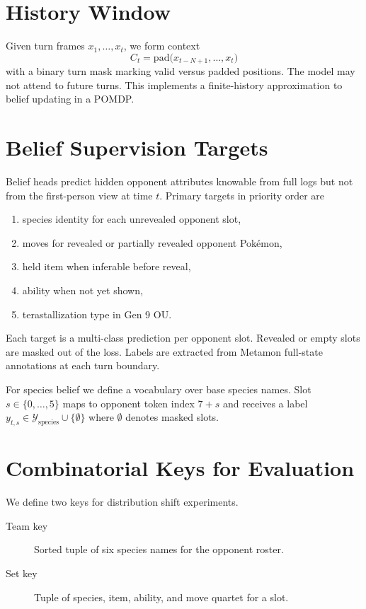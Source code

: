 \section{History Window}

Given turn frames $x_1, \ldots, x_t$, we form context
\[
  C_t = \mathrm{pad}\bigl(x_{t-N+1}, \ldots, x_t\bigr)
\]
with a binary turn mask marking valid versus padded positions. The model may
not attend to future turns. This implements a finite-history approximation to
belief updating in a POMDP.

\section{Belief Supervision Targets}

Belief heads predict hidden opponent attributes knowable from full logs but not
from the first-person view at time $t$. Primary targets in priority order are
\begin{enumerate}
  \item species identity for each unrevealed opponent slot,
  \item moves for revealed or partially revealed opponent Pok\'emon,
  \item held item when inferable before reveal,
  \item ability when not yet shown,
  \item terastallization type in Gen 9 OU.
\end{enumerate}

Each target is a multi-class prediction per opponent slot. Revealed or empty
slots are masked out of the loss. Labels are extracted from Metamon full-state
annotations at each turn boundary.

For species belief we define a vocabulary over base species names. Slot $s
\in \{0,\ldots,5\}$ maps to opponent token index $7+s$ and receives a label
$y_{t,s} \in \mathcal{Y}_\mathrm{species} \cup \{\emptyset\}$ where $\emptyset$
denotes masked slots.

\section{Combinatorial Keys for Evaluation}

We define two keys for distribution shift experiments.
\begin{description}
  \item[Team key] Sorted tuple of six species names for the opponent roster.
  \item[Set key] Tuple of species, item, ability, and move quartet for a slot.
\end{description}


